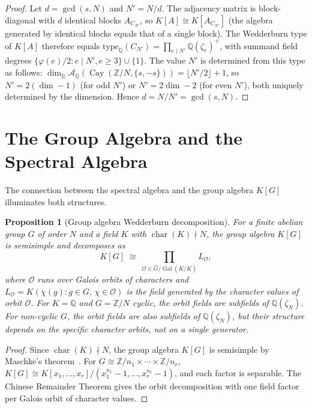 \documentclass[12pt]{amsart}
\numberwithin{equation}{section}
\theoremstyle{plain}
\newtheorem{proposition}[theorem]{Proposition}
\theoremstyle{definition}
\DeclareMathOperator{\Gal}{Gal}
\DeclareMathOperator{\ch}{char}
\DeclareMathOperator{\Cay}{Cay}
\newcommand{\Z}{\mathbb{Z}}
\newcommand{\Q}{\mathbb{Q}}
\newcommand{\calA}{\mathcal{A}}
\newcommand{\calO}{\mathcal{O}}
\newcommand{\Ghat}{\widehat{G}}
\begin{document}
\begin{proof}
Let $d = \gcd(s,N)$ and $N' = N/d$.  The adjacency matrix is
block-diagonal with $d$ identical blocks $A_{C_{N'}}$, so
$K[A] \cong K[A_{C_{N'}}]$ (the algebra generated by identical blocks
equals that of a single block).  The Wedderburn type of $K[A]$ therefore
equals $\mathrm{type}_\Q(C_{N'}) = \prod_{e \mid N'} \Q(\zeta_e)^+$,
with summand field degrees $\{\varphi(e)/2 : e \mid N', e \ge 3\}
\cup \{1\}$.  The value $N'$ is determined from this type as follows:
$\dim_\Q \calA_\Q(\Cay(\Z/N,\{s,-s\})) = \lfloor N'/2\rfloor + 1$,
so $N' = 2(\dim - 1)$ (for odd $N'$) or $N' = 2\dim - 2$ (for even $N'$),
both uniquely determined by the dimension.  Hence $d = N/N' = \gcd(s,N)$.
\end{proof}

\section{The Group Algebra and the Spectral Algebra}
\label{sec:groupalg}

The connection between the spectral algebra and the group algebra $K[G]$
illuminates both structures.

\begin{proposition}[Group algebra Wedderburn decomposition]
\label{prop:groupalg}
For a finite abelian group $G$ of order $N$ and a field $K$ with
$\ch(K) \nmid N$, the group algebra $K[G]$ is semisimple and decomposes as
\[
  K[G] \;\cong\; \prod_{\calO \in \Ghat/\Gal(\overline{K}/K)} L_\calO,
\]
where $\calO$ runs over Galois orbits of characters and
$L_\calO = K(\chi(g) : g \in G,\, \chi \in \calO)$ is the field generated
by the character values of orbit $\calO$.  For $K = \Q$ and $G = \Z/N$
cyclic, the orbit fields are subfields of $\Q(\zeta_N)$.  For non-cyclic
$G$, the orbit fields are also subfields of $\Q(\zeta_N)$, but their
structure depends on the specific character orbits, not on a single generator.
\end{proposition}

\begin{proof}
Since $\ch(K) \nmid N$, the group algebra $K[G]$ is semisimple by
Maschke's theorem~\cite{Lang02}.  For $G \cong \Z/n_1 \times \cdots
\times \Z/n_r$, $K[G] \cong K[x_1,\ldots,x_r]/(x_1^{n_1}-1,\ldots,
x_r^{n_r}-1)$, and each factor is separable.  The Chinese Remainder
Theorem gives the orbit decomposition with one field factor per Galois
orbit of character values.
\end{proof}
\end{document}
